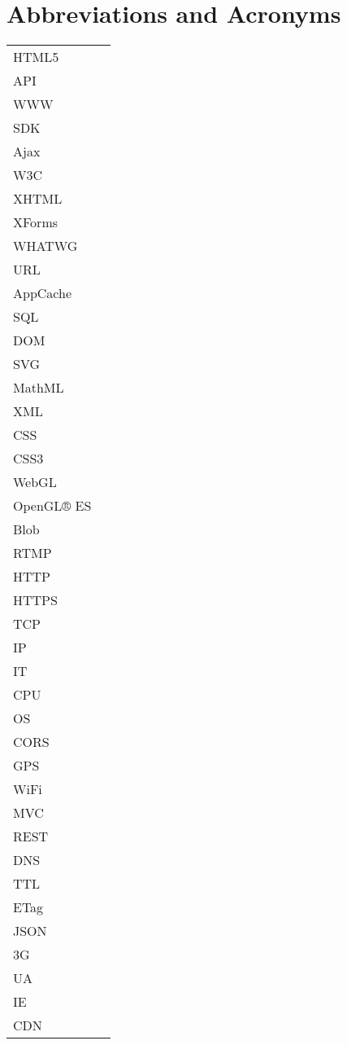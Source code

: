 \chapter*{Abbreviations and Acronyms}

\noindent
\begin{longtable}{@{}p{}p{}@{}}

HTML5 & \\
API & \\
WWW & \\
SDK & \\
Ajax & \\
W3C & \\
XHTML & \\
XForms & \\
WHATWG & \\
URL & \\
AppCache & \\
SQL & \\
DOM & \\
SVG & \\
MathML & \\
XML & \\
CSS & \\
CSS3 & \\
WebGL & \\
OpenGL® ES & \\
Blob & \\
RTMP & \\
HTTP & \\
HTTPS & \\
TCP & \\
IP & \\
IT & \\
CPU & \\
OS & \\
CORS & \\
GPS & \\
WiFi & \\
MVC & \\
REST & \\
DNS & \\
TTL & \\
ETag & \\
JSON & \\
3G & \\
UA & \\
IE & \\
CDN & \\

\end{longtable}
